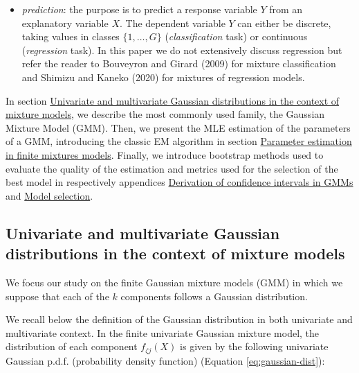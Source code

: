 \begin{itemize}
\tightlist
\item
  \emph{prediction}: the purpose is to predict a response variable \(Y\) from
  an explanatory variable \(X\). The dependent variable \(Y\) can either
  be discrete, taking values in classes \(\{1, \ldots, G\}\)
  (\emph{classification} task) or continuous (\emph{regression} task). In this
  paper we do not extensively discuss regression but refer the reader
  to Bouveyron and Girard (2009) for mixture classification and
  Shimizu and Kaneko (2020) for mixtures of regression models.
\end{itemize}

In section \protect\hyperlink{univariate-and-multivariate-gaussian-distributions-in-the-context-of-mixture-models}{Univariate and multivariate Gaussian distributions in the context of mixture models}, we describe the most
commonly used family, the Gaussian Mixture Model (GMM). Then, we present
the MLE estimation of the parameters of a GMM, introducing the classic
EM algorithm in section \protect\hyperlink{parameter-estimation-in-finite-mixtures-models}{Parameter estimation in finite mixtures models}. Finally, we introduce bootstrap methods used to evaluate the
quality of the estimation and metrics used for the selection of the best
model in respectively appendices \protect\hyperlink{derivation-of-confidence-intervals-in-gmms}{Derivation of confidence intervals in GMMs} and \protect\hyperlink{model-selection}{Model selection}.

\hypertarget{univariate-and-multivariate-gaussian-distributions-in-the-context-of-mixture-models}{%
\subsection{Univariate and multivariate Gaussian distributions in the context of mixture models}\label{univariate-and-multivariate-gaussian-distributions-in-the-context-of-mixture-models}}

We focus our study on the finite Gaussian mixture models (GMM) in which we
suppose that each of the \(k\) components follows a Gaussian
distribution.

We recall below the definition of the Gaussian
distribution in both univariate and multivariate context. In the finite univariate Gaussian mixture model, the distribution of
each component \(f_{\zeta j}(X)\) is given by the following univariate
Gaussian p.d.f. (probability density function) (Equation
\eqref{eq:gaussian-dist}):

